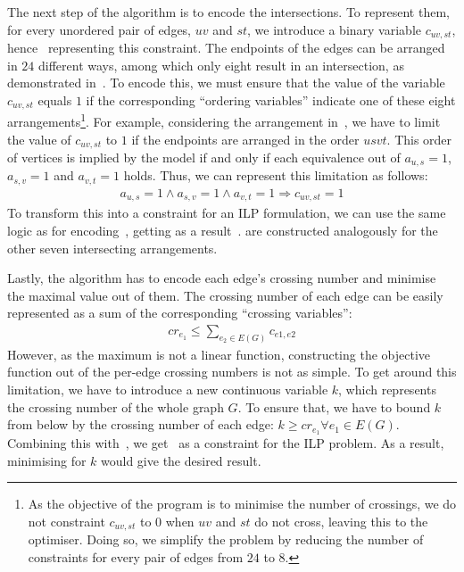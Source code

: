 The next step of the algorithm is to encode the intersections. To represent them, for every unordered pair of edges, \(uv\) and \(st\), we introduce a binary variable \(c_{uv, st}\), hence~ representing this constraint. The endpoints of the edges can be arranged in \(24\) different ways, among which only eight result in an intersection, as demonstrated in~. To encode this, we must ensure that the value of the variable \(c_{uv, st}\) equals \(1\) if the corresponding ``ordering variables'' indicate one of these eight arrangements\footnote{As the objective of the program is to minimise the number of crossings, we do not constraint \(c_{uv, st}\) to \(0\) when \(uv\) and \(st\) do not cross, leaving this to the optimiser. Doing so, we simplify the problem by reducing the number of constraints for every pair of edges from \(24\) to \(8\).}. For example, considering the arrangement in~, we have to limit the value of \(c_{uv, st}\) to \(1\) if the endpoints are arranged in the order \(usvt\). This order of vertices is implied by the model if and only if each equivalence out of \(a_{u,s} = 1\), \(a_{s,v} = 1\) and \(a_{v,t} = 1\) holds. Thus, we can represent this limitation as follows:
\begin{align*}
    a_{u,s} = 1 \land a_{s,v} = 1 \land a_{v,t} = 1 \Longrightarrow c_{uv, st} = 1
\end{align*}
To transform this into a constraint for an ILP formulation, we can use the same logic as for encoding~, getting as a result~.  are constructed analogously for the other seven intersecting arrangements.

Lastly, the algorithm has to encode each edge's crossing number and minimise the maximal value out of them. The crossing number of each edge can be easily represented as a sum of the corresponding ``crossing variables'':
\begin{align}
    \label{eq:ilp:crossing-number}
    cr_{e_1} \leqslant \sum_{e_2 \in E(G)} c_{e1, e2}
\end{align}
However, as the maximum is not a linear function, constructing the objective function out of the per-edge crossing numbers is not as simple. To get around this limitation, we have to introduce a new continuous variable \(k\), which represents the crossing number of the whole graph \(G\). To ensure that, we have to bound \(k\) from below by the crossing number of each edge: \(k \geqslant cr_{e_1} \forall e_1 \in E(G)\). Combining this with~, we get~ as a constraint for the ILP problem. As a result, minimising for \(k\) would give the desired result.

